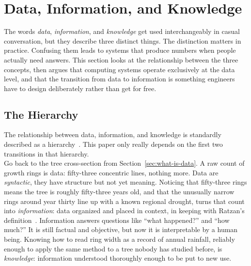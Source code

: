 \newpage
\section{Data, Information, and Knowledge}
\label{sec:data-information-knowledge}

The words \emph{data}, \emph{information}, and \emph{knowledge} get used
interchangeably in casual conversation, but they describe three distinct
things. The distinction matters in practice. Confusing them leads to systems
that produce numbers when people actually need answers. This section looks at
the relationship between the three concepts, then argues that computing
systems operate exclusively at the data level, and that the transition from
data to information is something engineers have to design deliberately rather
than get for free.

\subsection{The Hierarchy}

The relationship between data, information, and knowledge is standardly
described as a hierarchy~\autocite{ackoff1989,rowley2007}. This paper only
really depends on the first two transitions in that hierarchy.\\
Go back to the tree cross-section from Section~\ref{sec:what-is-data}. A raw
count of growth rings is data: fifty-three concentric lines, nothing more.
Data are \emph{syntactic}, they have structure but not yet meaning. Noticing
that fifty-three rings means the tree is roughly fifty-three years old, and
that the unusually narrow rings around year thirty line up with a known
regional drought, turns that count into \emph{information}: data organized and
placed in context, in keeping with Ratzan's definition~\autocite{ratzan2004}.
Information answers questions like ``what happened?'' and ``how much?'' It is
still factual and objective, but now it is interpretable by a human being.
Knowing how to read ring width as a record of annual rainfall, reliably enough
to apply the same method to a tree nobody has studied before, is
\emph{knowledge}: information understood thoroughly enough to be put to new
use.

